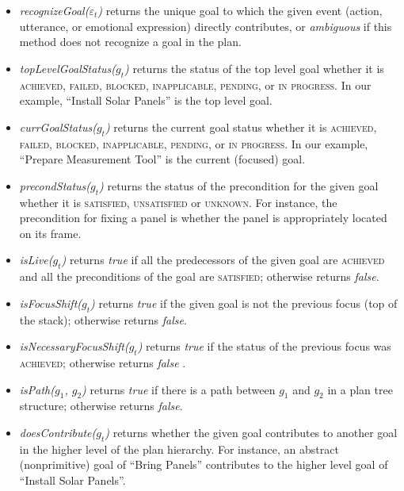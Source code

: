 \documentclass{article}
\begin{document}
\begin{itemize}[leftmargin=2pt]
  \setlength\itemsep{0.2mm}
  \item \textit{recognizeGoal($\varepsilon_t$)} returns the unique goal to which
  the given event (action, utterance, or emotional expression) directly
  contributes, or \textit{ambiguous} if this method does not recognize a goal in
  the plan.
  
  \item \textit{topLevelGoalStatus($g_t$)} returns the status of the top level
  goal whether it is \textsc{achieved, failed, blocked, inapplicable, pending,}
  or \textsc{in progress}.
  In our example, ``Install Solar Panels'' is the top level goal.
  
  \item \textit{currGoalStatus($g_t$)} returns the current goal status whether
  it is \textsc{achieved, failed, blocked, inapplicable, pending,} or \textsc{in
  progress}. In our example, ``Prepare Measurement Tool'' is the current
  (focused) goal.
  
  \item \textit{precondStatus($g_t$)} returns the status of the precondition for
  the given goal whether it is \textsc{satisfied, unsatisfied} or
  \textsc{unknown}. For instance, the precondition for fixing a panel is whether
  the panel is appropriately located on its frame.
  
  \item \textit{isLive($g_t$)} returns \textit{true} if all the predecessors of
  the given goal are \textsc{achieved} and all the preconditions of the goal are
  \textsc{satisfied}; otherwise returns \textit{false}.
  
  \item \textit{isFocusShift($g_t$)} returns \textit{true} if the given
  goal is not the previous focus (top of the stack); otherwise returns
  \textit{false}.
  
  \item \textit{isNecessaryFocusShift($g_t$)} returns \textit{true} if the
  status of the previous focus was \textsc{achieved}; otherwise returns
  \textit{false} \cite{rich:focused-unfocused-users}.
  
  \item \textit{isPath($g_1$, $g_2$)} returns \textit{true} if there is a path
  between $g_1$ and $g_2$ in a plan tree structure; otherwise returns
  \textit{false}.
  
  \item \textit{doesContribute($g_t$)} returns whether the given goal
  contributes to another goal in the higher level of the plan hierarchy. For
  instance, an abstract (nonprimitive) goal of ``Bring Panels'' contributes to
  the higher level goal of ``Install Solar Panels''.
  

\end{itemize}
\end{document}
